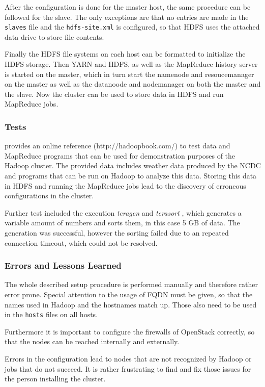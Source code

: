 After the configuration is done for the master host, the same procedure can be followed for the slave. 
The only exceptions are that no entries are made in the \texttt{slaves} file 
and the \texttt{hdfs-site.xml} is configured, so that \ac{HDFS} uses the attached data drive to store file contents.

Finally the \ac{HDFS} file systems on each host can be formatted to initialize the \ac{HDFS} storage.
Then \ac{YARN} and \ac{HDFS}, as well as the MapReduce history server is started on the master, 
which in turn start the namenode and resoucemanager on the master 
as well as the datanoode and nodemanager on both the master and the slave.
Now the cluster can be used to store data in \ac{HDFS} and run MapReduce jobs.

\subsubsection{Tests}
\autocite[][]{white2015hadoop} provides an online reference (http://hadoopbook.com/)
to test data and MapReduce programs 
that can be used for demonstration purposes of the Hadoop cluster.
The provided data includes weather data produced by the \ac{NCDC} and programs that can be run on Hadoop to analyze this data. 
Storing this data in \ac{HDFS} and running the MapReduce jobs lead to the discovery of erroneous configurations in the cluster.

Further test included the execution \emph{teragen} and \emph{terasort} \autocite[][]{omally2008terasort}, which generates a variable amount of numbers and sorts them, in this case 5 \ac{GB} of data. 
The generation  was successful, however the sorting failed due to an repeated connection timeout, which could not be resolved.

\subsubsection{Errors and Lessons Learned}
The whole described setup procedure is performed manually 
and therefore rather error prone.
Special attention to the usage of \acs{FQDN} must be given, 
so that the names used in Hadoop and the hostnames match up.
Those also need to be used in the \texttt{hosts} files on all hosts.

Furthermore it is important to configure the firewalls of OpenStack correctly, 
so that the nodes can be reached internally and externally.

Errors in the configuration lead to nodes that are not recognized by Hadoop or jobs that do not succeed.
It is rather frustrating to find and fix those issues for the person installing the cluster.

